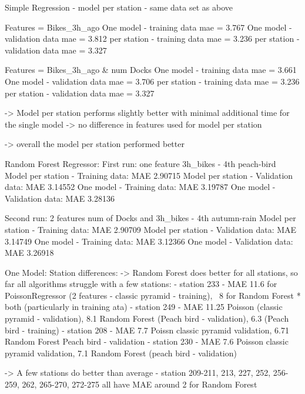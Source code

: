 \documentclass{article}
\begin{document}
{{{        Simple Regression - model per station
        - same data set as above

            Features = Bikes_3h_ago
            One model - training data mae = 3.767
            One model - validation data mae = 3.812
            per station - training data mae = 3.236
            per station - validation data mae = 3.327

            Features = Bikes_3h_ago & num Docks
            One model - training data mae = 3.661
            One model - validation data mae = 3.706
            per station - training data mae = 3.236
            per station - validation data mae = 3.327

        -> Model per station performs slightly better with minimal additional time for the single model
        -> no difference in features used for model per station

        -> overall the model per station performed better

        Random Forest Regressor:
        First run: one feature 3h_bikes - 4th peach-bird
        Model per station - Training data: MAE 2.90715
        Model per station - Validation data: MAE 3.14552
        One model - Training data: MAE 3.19787
        One model - Validation data: MAE 3.28136

        Second run: 2 features num of Docks and 3h_bikes - 4th autumn-rain
        Model per station - Training data: MAE 2.90709
        Model per station - Validation data: MAE 3.14749
        One model - Training data: MAE 3.12366
        One model - Validation data: MAE 3.26918

        One Model:
        Station differences:
        -> Random Forest does better for all stations, so far all algorithms struggle with a few stations:
        - station 233 - MAE 11.6 for PoissonRegressor (2 features - classic pyramid - training), ~8 for Random Forest * both (particularly in training ata)
        - station 249 - MAE 11.25 Poisson (classic pyramid - validation), 8.1 Random Forest (Peach bird - validation),
                        6.3 (Peach  bird - training)
        - station 208 - MAE 7.7 Poissn classic pyramid validation, 6.71 Random Forest Peach bird - validation
        - station 230 - MAE 7.6 Poisson classic pyramid validation, 7.1 Random Forest (peach bird - validation)

        -> A few stations do better than average
        - station 209-211, 213, 227, 252, 256-259, 262, 265-270, 272-275 all have MAE around 2 for Random Forest

}}}
\end{document}

